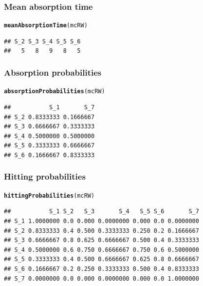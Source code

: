 \documentclass[aspectratio=169]{beamer}\usepackage[]{graphicx}\usepackage[]{xcolor}
\makeatletter
\newcommand{\hldef}[1]{\textcolor[rgb]{0.345,0.345,0.345}{#1}}%
\newcommand{\hlkwd}[1]{\textcolor[rgb]{0.737,0.353,0.396}{\textbf{#1}}}%
\newenvironment{kframe}{%
 \def\at@end@of@kframe{}%
 \ifinner\ifhmode%
  \def\at@end@of@kframe{\end{minipage}}%
  \begin{minipage}{\columnwidth}%
 \fi\fi%
 \def\FrameCommand##1{\hskip\@totalleftmargin \hskip-\fboxsep
 \colorbox{shadecolor}{##1}\hskip-\fboxsep
     \hskip-\linewidth \hskip-\@totalleftmargin \hskip\columnwidth}%
 \MakeFramed {\advance\hsize-\width
   \@totalleftmargin\z@ \linewidth\hsize
   \@setminipage}}%
 {\par\unskip\endMakeFramed%
 \at@end@of@kframe}
\newenvironment{knitrout}{}{} %
\makeatother
\begin{document}
\begin{frame}[fragile]\frametitle{Mean absorption time}
\begin{knitrout}
\color{fgcolor}\begin{kframe}
\begin{alltt}
\hlkwd{meanAbsorptionTime}\hldef{(mcRW)}
\end{alltt}
\begin{verbatim}
## S_2 S_3 S_4 S_5 S_6 
##   5   8   9   8   5
\end{verbatim}
\end{kframe}
\end{knitrout}
\end{frame}

\begin{frame}[fragile]\frametitle{Absorption probabilities}
\begin{knitrout}
\color{fgcolor}\begin{kframe}
\begin{alltt}
\hlkwd{absorptionProbabilities}\hldef{(mcRW)}
\end{alltt}
\begin{verbatim}
##           S_1       S_7
## S_2 0.8333333 0.1666667
## S_3 0.6666667 0.3333333
## S_4 0.5000000 0.5000000
## S_5 0.3333333 0.6666667
## S_6 0.1666667 0.8333333
\end{verbatim}
\end{kframe}
\end{knitrout}
\end{frame}

\begin{frame}[fragile]\frametitle{Hitting probabilities}
\begin{knitrout}
\color{fgcolor}\begin{kframe}
\begin{alltt}
\hlkwd{hittingProbabilities}\hldef{(mcRW)}
\end{alltt}
\begin{verbatim}
##           S_1 S_2   S_3       S_4   S_5 S_6       S_7
## S_1 1.0000000 0.0 0.000 0.0000000 0.000 0.0 0.0000000
## S_2 0.8333333 0.4 0.500 0.3333333 0.250 0.2 0.1666667
## S_3 0.6666667 0.8 0.625 0.6666667 0.500 0.4 0.3333333
## S_4 0.5000000 0.6 0.750 0.6666667 0.750 0.6 0.5000000
## S_5 0.3333333 0.4 0.500 0.6666667 0.625 0.8 0.6666667
## S_6 0.1666667 0.2 0.250 0.3333333 0.500 0.4 0.8333333
## S_7 0.0000000 0.0 0.000 0.0000000 0.000 0.0 1.0000000
\end{verbatim}
\end{kframe}
\end{knitrout}
\end{frame}
\end{document}
